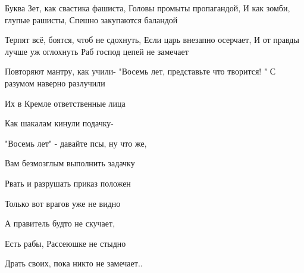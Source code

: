  
 
 
 
 


Буква Зет, как свастика фашиста,  
Головы промыты пропагандой,  
И как зомби, глупые рашисты,  
Спешно закупаются баландой  

Терпят всё, боятся, чтоб не сдохнуть,  
Если царь внезапно осерчает,  
И от правды лучше уж оглохнуть  
Раб господ цепей не замечает  

Повторяют мантру, как учили-  
"Восемь лет, представьте что творится! "  
С разумом наверно разлучили  

Их в Кремле ответственные лица  

 

Как шакалам кинули подачку-  

"Восемь лет" - давайте псы, ну что же,  

Вам безмозглым выполнить задачку  

Рвать и разрушать приказ положен  

 

Только вот врагов уже не видно  

А правитель будто не скучает,  

Есть рабы, Рассеюшке не стыдно  

Драть своих, пока никто не замечает..
